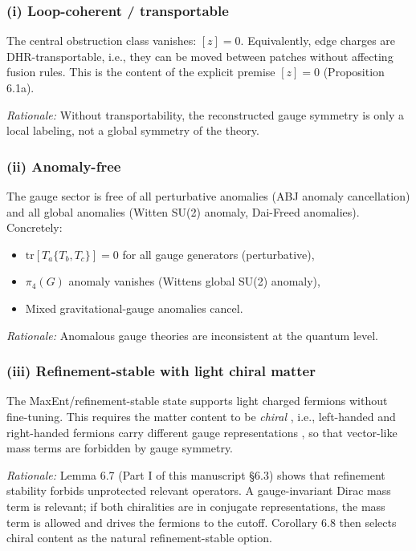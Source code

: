 \subsubsection{(i) Loop-coherent / transportable}\label{i-loop-coherent--transportable}

The central obstruction class vanishes: \([z] = 0\). Equivalently, edge charges are DHR-transportable, i.e., they can be moved between patches without affecting fusion rules. This is the content of the explicit premise \([z] = 0\) (Proposition 6.1a).

\emph{Rationale:} Without transportability, the reconstructed gauge symmetry is only a local labeling, not a global symmetry of the theory.

\subsubsection{(ii) Anomaly-free}\label{ii-anomaly-free}

The gauge sector is free of all perturbative anomalies (ABJ anomaly cancellation) and all global anomalies (Witten SU(2) anomaly, Dai-Freed anomalies). Concretely:

\begin{itemize}
\tightlist
\item
  \(\mathrm{tr}[T_a \{T_b, T_c\}] = 0\) for all gauge generators (perturbative),
\item
  \(\pi_4(G)\) anomaly vanishes (Witten\textquotesingle s global SU(2) anomaly),
\item
  Mixed gravitational-gauge anomalies cancel.
\end{itemize}

\emph{Rationale:} Anomalous gauge theories are inconsistent at the quantum level.

\subsubsection{(iii) Refinement-stable with light chiral matter}\label{iii-refinement-stable-with-light-chiral-matter}

The MaxEnt/refinement-stable state supports light charged fermions without fine-tuning. This requires the matter content to be \emph{chiral} , i.e., left-handed and right-handed fermions carry different gauge representations , so that vector-like mass terms are forbidden by gauge symmetry.

\emph{Rationale:} Lemma 6.7 (Part I of this manuscript \S{}6.3) shows that refinement stability forbids unprotected relevant operators. A gauge-invariant Dirac mass term is relevant; if both chiralities are in conjugate representations, the mass term is allowed and drives the fermions to the cutoff. Corollary 6.8 then selects chiral content as the natural refinement-stable option.

